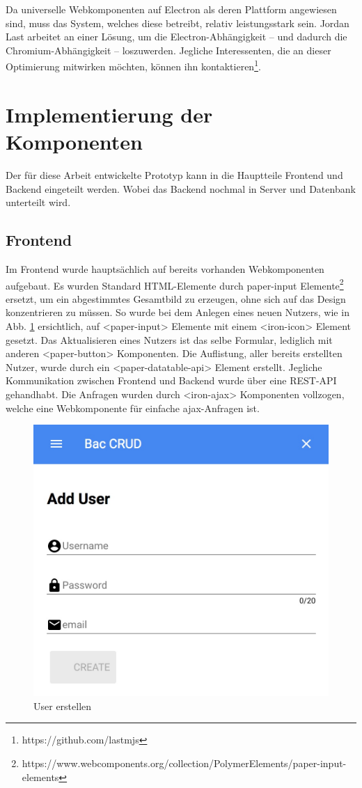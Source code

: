 Da universelle Webkomponenten auf Electron als deren Plattform angewiesen sind, muss das System, welches diese betreibt, relativ leistungsstark sein. Jordan Last arbeitet an einer Lösung, um die Electron-Abhängigkeit -- und dadurch die Chromium-Abhängigkeit -- loszuwerden. Jegliche Interessenten, die an dieser Optimierung mitwirken möchten, können ihn kontaktieren\footnote{https://github.com/lastmjs}.

\section{Implementierung der Komponenten}
Der für diese Arbeit entwickelte Prototyp kann in die Hauptteile Frontend und Backend eingeteilt werden. Wobei das Backend nochmal in Server und Datenbank unterteilt wird. 

\subsection{Frontend}
Im Frontend wurde hauptsächlich auf bereits vorhanden Webkomponenten aufgebaut. Es wurden Standard HTML-Elemente durch paper-input Elemente\footnote{https://www.webcomponents.org/collection/PolymerElements/paper-input-elements} ersetzt, um ein abgestimmtes Gesamtbild zu erzeugen, ohne sich auf das Design konzentrieren zu müssen. So wurde bei dem Anlegen eines neuen Nutzers, wie in Abb. \ref{fig:user_create} ersichtlich, auf <paper-input> Elemente mit einem <iron-icon> Element gesetzt. Das Aktualisieren eines Nutzers ist das selbe Formular, lediglich mit anderen <paper-button> Komponenten. Die Auflistung, aller bereits erstellten Nutzer, wurde durch ein <paper-datatable-api> Element erstellt. Jegliche Kommunikation zwischen Frontend und Backend wurde über eine REST-API gehandhabt. Die Anfragen wurden durch <iron-ajax> Komponenten vollzogen, welche eine Webkomponente für einfache ajax-Anfragen ist.
\begin{figure}
	\centering
	\includegraphics[width=0.5\linewidth]{images/user_create.jpeg}
	\caption{User erstellen}
	\label{fig:user_create}
\end{figure}

